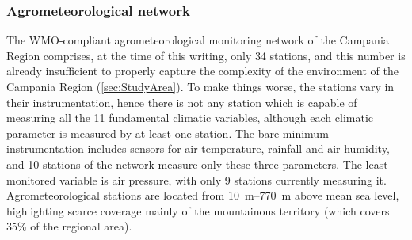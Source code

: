 \documentclass[authoryear,preprint,review,12pt]{elsarticle}
\begin{document}
\subsubsection{Agrometeorological network\label{RARStructure}}

The WMO-compliant agrometeorological monitoring network of the Campania Region comprises, at the time of this writing, only 34 stations, and this number is already insufficient to properly capture the complexity of the environment of the Campania Region (\cref{sec:StudyArea}).
To make things worse, the stations vary in their instrumentation, hence there is not any station which is capable of measuring all the 11 fundamental climatic variables, although each climatic parameter is measured by at least one station.
The bare minimum instrumentation includes sensors for air temperature, rainfall and air humidity, and 10 stations of the network measure only these three parameters.
The least monitored variable is air pressure, with only 9 stations currently measuring it.
Agrometeorological stations are located from \SIrange{10}{770}{\metre} above mean sea level, highlighting scarce coverage mainly of the mountainous territory (which covers 35\% of the regional area).
\end{document}
